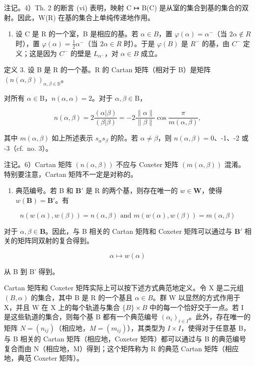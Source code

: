 注记。4）Th. 2 的断言 (vi) 表明，映射 C ↦ B(C) 是从室的集合到基的集合的双射。因此，W(R) 在基的集合上单纯传递地作用。

\begin{enumerate}
\def\labelenumi{\arabic{enumi})}
\setcounter{enumi}{4}
\tightlist
\item
  设 C 是 R 的一个室，B 是相应的基。若 \(\alpha\in B\)，置 \(\varphi(\alpha)=\alpha^{-}\)（当 \(2\alpha\notin R\) 时），置 \(\varphi(\alpha)=\frac{1}{2}\alpha^{-}\)（当 \(2\alpha\in R\) 时）。于是 \(\varphi(B)\) 是 \(R^{-}\) 的基，由 \(C^{-}\) 定义；这是因为 \(C^{-}\) 的壁是 \(L_{\alpha^{-}}\)，对 \(\alpha\in B\) 成立。
\end{enumerate}

定义 3. 设 B 是 R 的一个基。R 的 Cartan 矩阵（相对于 B）是矩阵 \((n(\alpha,\beta))_{\alpha,\beta\in\mathbb{B}}\)。

对所有 \(\alpha \in \mathrm{B}\)，\(n(\alpha, \alpha) = 2\)。对于 \(\alpha, \beta \in \mathrm{B}\)，

\[
n (\alpha , \beta) = 2 \frac {(\alpha | \beta)}{(\beta | \beta)} = - 2 \frac {\| \alpha \|}{\| \beta \|} \cos \frac {\pi}{m (\alpha , \beta)},\tag{11}
\]

其中 \(m(\alpha, \beta)\) 如上所述表示 \(s_{\alpha}s_{\beta}\) 的阶。若 \(\alpha \neq \beta\)，则 \(n(\alpha, \beta) = 0\)、-1、-2 或 -3（cf.~no. 3）。

注记。6）Cartan 矩阵 \((n(\alpha,\beta))\) 不应与 Coxeter 矩阵 \((m(\alpha,\beta))\) 混淆。特别要注意，Cartan 矩阵不一定是对称的。

\begin{enumerate}
\def\labelenumi{\arabic{enumi})}
\setcounter{enumi}{6}
\tightlist
\item
  典范编号。若 B 和 \(\mathbf{B}'\) 是 R 的两个基，则存在唯一的 \(w \in \mathbf{W}\)，使得 \(w(\mathbf{B}) = \mathbf{B}'\)。有
\end{enumerate}

\[
n (w (\alpha), w (\beta)) = n (\alpha , \beta) \text { and } m (w (\alpha), w (\beta)) = m (\alpha , \beta)
\]

对于 \(\alpha, \beta \in \mathbf{B}\)。因此，与 B 相关的 Cartan 矩阵和 Coxeter 矩阵可以通过与 \(\mathbf{B}'\) 相关的矩阵同双射的复合得到。

\[
\alpha \mapsto w (\alpha)
\]

从 B 到 B' 得到。

Cartan 矩阵和 Coxeter 矩阵实际上可以按下述方式典范地定义。令 X 是二元组 \((B, \alpha)\) 的集合，其中 B 是 R 的一个基且 \(\alpha \in B\)。群 W 以显然的方式作用于 X，并且 W 在 X 上的每个轨道与集合 \(\{B\} \times B\) 中的每一个恰好交于一点。若 I 是这些轨道的集合，则每个基 B 都有一个典范编号 \((\alpha_{i})_{i \in I}\)。此外，存在唯一的矩阵 \(N = (n_{ij})\)（相应地，\(M = (m_{ij})\)），其类型为 \(I \times I\)，使得对于任意基 B，与 B 相关的 Cartan 矩阵（相应地，Coxeter 矩阵）都可以通过与 B 的典范编号复合而由 N（相应地，M）得到；这个矩阵称为 R 的典范 Cartan 矩阵（相应地，典范 Coxeter 矩阵）。


